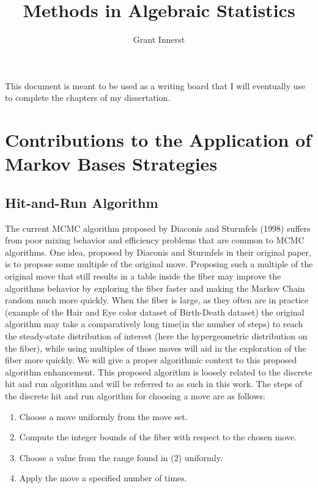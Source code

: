 \documentclass{phd}\usepackage[]{graphicx}\usepackage[]{color}
\title{Methods in Algebraic Statistics}
\author{Grant Innerst}
\begin{document}
This document is meant to be used as a writing board that I will eventually use to complete the chapters of my dissertation. 


\section{Contributions to the Application of Markov Bases Strategies}
\subsection{Hit-and-Run Algorithm}
The current MCMC algorithm proposed by Diaconis and Sturmfels (1998) suffers from poor mixing behavior and efficiency problems that are common to MCMC algorithms. One idea, proposed by Diaconis and Sturmfels in their original paper, is to propose some multiple of the original move. Proposing such a multiple of the original move that still results in a table inside the fiber may improve the algorithms behavior by exploring the fiber faster and making the Markov Chain random much more quickly. When the fiber is large, as they often are in practice (example of the Hair and Eye color dataset of Birth-Death dataset) the original algorithm may take a comparatively long time(in the number of steps) to reach the steady-state distribution of interest (here the hypergeometric distribution on the fiber), while using multiples of those moves will aid in the exploration of the fiber more quickly. We will give a proper algorithmic context to this proposed algorithm enhancement. This proposed algorithm is loosely related to the discrete hit and run algorithm and will be referred to as such in this work. The steps of the discrete hit and run algorithm for choosing a move are as follows:
\begin{enumerate}
\item Choose a move uniformly from the move set.
\item Compute the integer bounds of the fiber with respect to the chosen move.
\item Choose a value from the range found in (2) uniformly.
\item Apply the move a specified number of times.
\end{enumerate}
\end{document}
